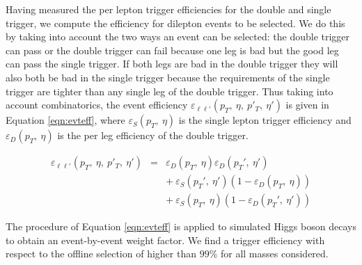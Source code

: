 
Having measured the per lepton trigger efficiencies 
for the double and single trigger,
we compute the efficiency for dilepton events to be selected.
We do this by taking into account the two ways an event can be selected: 
the double trigger can pass or the double trigger can fail because one leg is bad
but the good leg can pass the single trigger.
If both legs are bad in the double trigger they will also both be bad in the single trigger
because the requirements of the single trigger are tighter than any single leg of the double trigger.
Thus taking into account combinatorics, the event efficiency $\varepsilon_{\ell\ell'}(p_T,\:\eta,\:p'_T,\:\eta')$
is given in Equation \ref{eqn:evteff}, where $\varepsilon_{S}(p_T,\:\eta)$ is the single 
lepton trigger efficiency and
$\varepsilon_{D}(p_T,\:\eta)$ is the per leg efficiency of the double trigger.

\begin{eqnarray}
\label{eqn:evteff}
\varepsilon_{\ell\ell'}(p_T,\:\eta,\:p'_T,\:\eta') & = & \varepsilon_{D}(p_T,\:\eta) \varepsilon_{D}(p_T',\:\eta') \nonumber\\
               &   & +~\varepsilon_{S}(p_T',\:\eta')(1-\varepsilon_{D}(p_T,\:\eta)) \nonumber\\
               &   & +~\varepsilon_{S}(p_T,\:\eta)(1-\varepsilon_{D}(p_T',\:\eta'))
\end{eqnarray}

The procedure of Equation \ref{eqn:evteff} is applied to simulated Higgs boson decays to obtain an event-by-event weight factor. We find a 
trigger efficiency with respect to the offline selection of higher than $99\%$ for all masses considered.

